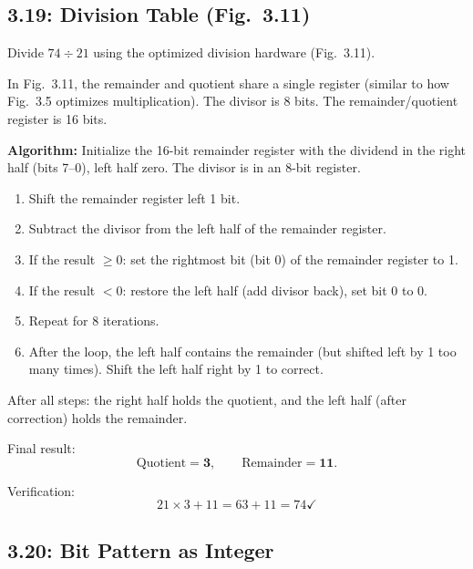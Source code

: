 \subsection*{3.19: Division Table (Fig.~3.11)}
\hypertarget{sol-3.19}{}

Divide $74 \div 21$ using the optimized division hardware (Fig.~3.11).

In Fig.~3.11, the remainder and quotient share a single register (similar to how
Fig.~3.5 optimizes multiplication). The divisor is 8 bits. The
remainder/quotient register is 16 bits.

\medskip\noindent\textbf{Algorithm:}
Initialize the 16-bit remainder register with the dividend in the right half
(bits 7--0), left half zero. The divisor is in an 8-bit register.

\begin{enumerate}
  \item Shift the remainder register left 1 bit.
  \item Subtract the divisor from the left half of the remainder register.
  \item If the result $\ge 0$: set the rightmost bit (bit 0) of the remainder
        register to 1.
  \item If the result $< 0$: restore the left half (add divisor back), set bit 0
        to 0.
  \item Repeat for 8 iterations.
  \item After the loop, the left half contains the remainder (but shifted left by
        1 too many times). Shift the left half right by 1 to correct.
\end{enumerate}

After all steps: the right half holds the quotient, and the left half (after
correction) holds the remainder.

Final result:
\[
  \text{Quotient} = \mathbf{3}, \qquad \text{Remainder} = \mathbf{11}.
\]

Verification:
\[
  21 \times 3 + 11 = 63 + 11 = 74 \checkmark
\]

\subsection*{3.20: Bit Pattern as Integer}
\hypertarget{sol-3.20}{}

